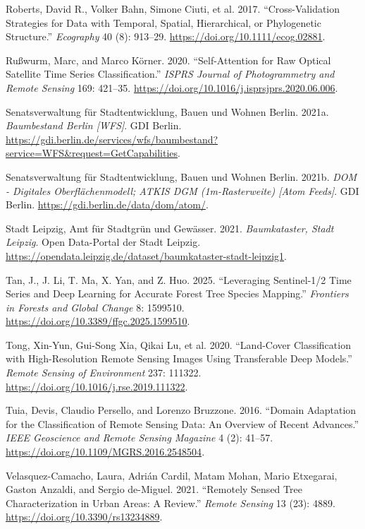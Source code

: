 \documentclass[11pt,a4paper]{scrartcl}
\begin{document}
\begin{CSLReferences}{1}{1}
Roberts, David R., Volker Bahn, Simone Ciuti, et al. 2017.
{``Cross-Validation Strategies for Data with Temporal, Spatial,
Hierarchical, or Phylogenetic Structure.''} \emph{Ecography} 40 (8):
913--29. \url{https://doi.org/10.1111/ecog.02881}.

Rußwurm, Marc, and Marco Körner. 2020. {``Self-Attention for Raw Optical
Satellite Time Series Classification.''} \emph{ISPRS Journal of
Photogrammetry and Remote Sensing} 169: 421--35.
\url{https://doi.org/10.1016/j.isprsjprs.2020.06.006}.

Senatsverwaltung für Stadtentwicklung, Bauen und Wohnen Berlin. 2021a.
\emph{Baumbestand Berlin {[}WFS{]}}. GDI Berlin.
\url{https://gdi.berlin.de/services/wfs/baumbestand?service=WFS&request=GetCapabilities}.

Senatsverwaltung für Stadtentwicklung, Bauen und Wohnen Berlin. 2021b.
\emph{DOM - Digitales Oberfl{ä}chenmodell; ATKIS DGM (1m-Rasterweite)
{[}Atom Feeds{]}}. GDI Berlin.
\url{https://gdi.berlin.de/data/dom/atom/}.

Stadt Leipzig, Amt für Stadtgrün und Gewässer. 2021. \emph{Baumkataster,
Stadt Leipzig}. Open Data-Portal der Stadt Leipzig.
\url{https://opendata.leipzig.de/dataset/baumkataster-stadt-leipzig1}.

Tan, J., J. Li, T. Ma, X. Yan, and Z. Huo. 2025. {``Leveraging
Sentinel-1/2 Time Series and Deep Learning for Accurate Forest Tree
Species Mapping.''} \emph{Frontiers in Forests and Global Change} 8:
1599510. \url{https://doi.org/10.3389/ffgc.2025.1599510}.

Tong, Xin-Yun, Gui-Song Xia, Qikai Lu, et al. 2020. {``Land-Cover
Classification with High-Resolution Remote Sensing Images Using
Transferable Deep Models.''} \emph{Remote Sensing of Environment} 237:
111322. \url{https://doi.org/10.1016/j.rse.2019.111322}.

Tuia, Devis, Claudio Persello, and Lorenzo Bruzzone. 2016. {``Domain
Adaptation for the Classification of Remote Sensing Data: An Overview of
Recent Advances.''} \emph{IEEE Geoscience and Remote Sensing Magazine} 4
(2): 41--57. \url{https://doi.org/10.1109/MGRS.2016.2548504}.

{Velasquez-Camacho, Laura, Adrián Cardil, Matam Mohan, Mario Etxegarai,
Gaston Anzaldi, and Sergio de-Miguel}. 2021. {``Remotely Sensed Tree
Characterization in Urban Areas: A Review.''} \emph{Remote Sensing} 13
(23): 4889. \url{https://doi.org/10.3390/rs13234889}.


\end{CSLReferences}
\end{document}
